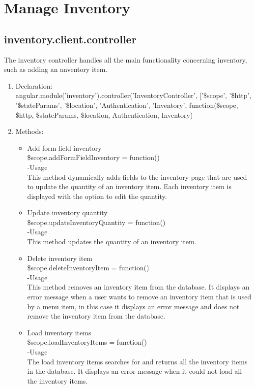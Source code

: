 \documentclass[a4paper,12pt]{article}
\begin{document}
\section{Manage Inventory}
\subsection{inventory.client.controller}
 The inventory controller handles all the main functionality concerning inventory, such as adding an anventory item.
\begin{enumerate}
\item Declaration:\\angular.module('inventory').controller('InventoryController', ['\$scope', '\$http', '\$stateParams', '\$location', 'Authentication', 'Inventory',
	function(\$scope, \$http, \$stateParams, \$location, Authentication, Inventory)
\item Methods:
	\begin{itemize}
	\item Add form field inventory\\
  \$scope.addFormFieldInventory = function()\\
  -Usage\\
  This method dynamically adds fields to the inventory page that are used to update the quantity of an inventory item. Each inventory item is displayed with the option to edit the quantity.
\item  Update inventory quantity\\
 \$scope.updateInventoryQuantity = function()\\
 -Usage\\
 This method updates the quantity of an inventory item.
 \item Delete inventory item\\
  \$scope.deleteInventoryItem = function()\\
  -Usage\\
  This method removes an inventory item from the database. It displays an error message when a user wants to remove an inventory item that is used by a menu item, in this case it displays an error message and does not remove the inventory item from the database.
  \item Load inventory items\\
   \$scope.loadInventoryItems = function()\\
   -Usage\\
   The load inventory items searches for and returns all the inventory items in the database. It displays an error message when it could not load all the inventory items.

\end{itemize}
\end{enumerate}
\end{document}
